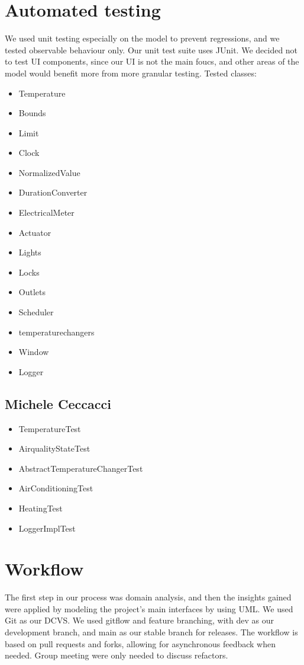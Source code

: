 \documentclass[a4paper,12pt]{report}
\begin{document}
\section{Automated testing}
We used unit testing especially on the model to prevent regressions, and we tested observable behaviour only.
Our unit test suite uses JUnit.
We decided not to test UI components, since our UI is not the main foucs,
and other areas of the model would benefit more from more granular testing. 
Tested classes:
\begin{itemize}
	\item Temperature
	\item Bounds
	\item Limit
	\item Clock
	\item NormalizedValue
	\item DurationConverter
	\item ElectricalMeter
	\item Actuator
	\item Lights
	\item Locks
	\item Outlets
	\item Scheduler
	\item temperaturechangers
	\item Window
	\item Logger
\end{itemize}

\subsection{Michele Ceccacci}
\begin{itemize}
	\item TemperatureTest
	\item AirqualityStateTest
	\item AbstractTemperatureChangerTest
	\item AirConditioningTest
	\item  HeatingTest
	\item LoggerImplTest
\end{itemize}


\section{Workflow}
The first step in our process was domain analysis, and then the insights gained were applied by modeling 
the project's main interfaces by using UML.
We used Git as our DCVS. We used gitflow and feature branching, with dev as our development branch,
and main as our stable branch for releases. The workflow is based on pull requests and forks, allowing for asynchronous feedback when needed.
Group meeting were only needed to discuss refactors. 
\end{document}
